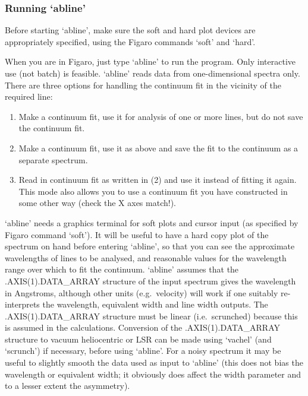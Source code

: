 
\subsubsection{\label{techno11running}Running `abline'}

   Before starting `abline', make sure the soft and hard plot devices
   are appropriately specified, using the Figaro commands `soft' and
   `hard'.

   When you are in Figaro, just type `abline' to run the program. Only
   interactive use (not batch) is feasible. `abline' reads data from
   one-dimensional spectra only. There are three options for handling
   the continuum fit in the vicinity of the required line:

\begin{enumerate}
\item
   Make a continuum fit, use it for analysis of one or more lines, but
   do not save the continuum fit.
\item
   Make a continuum fit, use it as above and save the fit to the
   continuum as a separate spectrum.
\item
   Read in continuum fit as written in (2) and use it instead of
   fitting it again. This mode also allows you to use a continuum fit
   you have constructed in some other way (check the X axes match!).
\end{enumerate}

   `abline' needs a graphics terminal for soft plots and cursor input
   (as specified by Figaro command `soft'). It will be useful to have a
   hard copy plot of the spectrum on hand before entering `abline', so
   that you can see the approximate wavelengths of lines to be analysed,
   and reasonable values for the wavelength range over which to fit the
   continuum. `abline' assumes that the .AXIS(1).DATA\_ARRAY structure of
   the input spectrum gives the wavelength in Angstroms, although other
   units (e.g.\ velocity) will work if one suitably re-interprets the
   wavelength, equivalent width and line width outputs. The
   .AXIS(1).DATA\_ARRAY structure must be linear (i.e.\ scrunched) because
   this is assumed in the calculations. Conversion of the
   .AXIS(1).DATA\_ARRAY structure to vacuum heliocentric or LSR can be
   made using `vachel' (and `scrunch') if necessary, before using
   `abline'. For a noisy spectrum it may be useful to slightly smooth
   the data used as input to `abline' (this does not bias the wavelength
   or equivalent width; it obviously does affect the width parameter and
   to a lesser extent the asymmetry).

